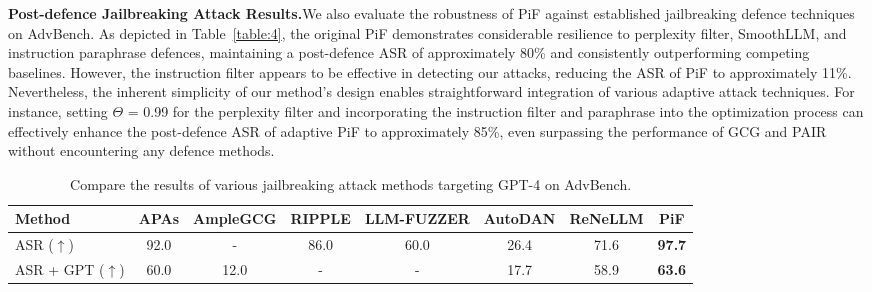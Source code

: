 \textbf{Post-defence Jailbreaking Attack Results.}\hspace*{2mm}We also evaluate the robustness of PiF against established jailbreaking defence techniques on AdvBench. 
As depicted in Table~\ref{table:4}, the original PiF demonstrates considerable resilience to perplexity filter, SmoothLLM, and instruction paraphrase defences, maintaining a post-defence ASR of approximately 80\% and consistently outperforming competing baselines.
However, the instruction filter appears to be effective in detecting our attacks, reducing the ASR of PiF to approximately 11\%.
Nevertheless, the inherent simplicity of our method's design enables straightforward integration of various adaptive attack techniques.
For instance, setting $\Theta$ = 0.99 for the perplexity filter and incorporating the instruction filter and paraphrase into the optimization process can effectively enhance the post-defence ASR of adaptive PiF to approximately 85\%, even surpassing the performance of GCG and PAIR without encountering any defence methods.


\begin{table*}[t]
\setlength{\tabcolsep}{9.5pt}
\fontsize{7.2}{10.}\selectfont
\caption{{Compare the results of various jailbreaking attack methods targeting GPT-4 on AdvBench.}} 
\vspace{-0.4em}
\label{table:3}
\centering
  \begin{tabular}{l | c  c  c  c  c  c  c}
    \toprule
    \toprule
    {Method} & {APAs} & {AmpleGCG} & {RIPPLE} & {LLM-FUZZER} & {AutoDAN} & {ReNeLLM} & {PiF} \\
    \midrule
    {ASR ($\uparrow$)} & {92.0} & {-} & {86.0} & {60.0} & {26.4} & {71.6} & \cellcolor{SelfColor!15}\textbf{{97.7}} \\ 
    \midrule     
    {ASR + GPT ($\uparrow$)} & {60.0} & {12.0} & {-} & {-} & {17.7} & {58.9} & \cellcolor{SelfColor!15}\textbf{{63.6}} \\ 
    \bottomrule
    \bottomrule
  \end{tabular}
  \vspace{-0.4em}
\end{table*}

